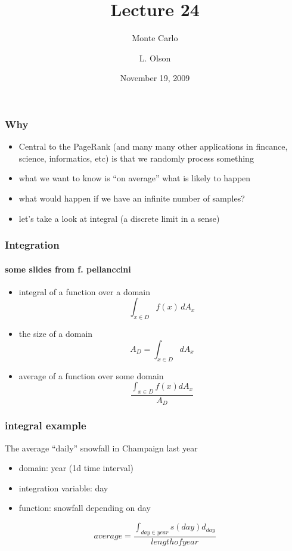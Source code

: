 \documentclass[10pt]{beamer}
\author{L. Olson}
\institute[UIUC]
{Department of Computer Science\\
University of Illinois at Urbana-Champaign\\
\vspace{0.5cm}
}
\title[CS 357]{Lecture 24}
\subtitle{Monte Carlo}
\date{November 19, 2009}
\begin{document}
\begin{frame}
  \titlepage
\end{frame}
\begin{frame}
\frametitle{Why}
\begin{itemize}
  \item Central to the PageRank (and many many other applications in
fincance, science, informatics, etc) is that we randomly process
something
  \item what we want to know is ``on average'' what is likely to happen
  \item what would happen if we have an infinite number of samples?
  \item let's take a look at integral (a discrete limit in a sense)
\end{itemize}
\end{frame}
\begin{frame}
\frametitle{Integration}
\framesubtitle{some slides from f. pellanccini}
  \begin{itemize}
  \item integral of a function over a domain
\begin{equation*} 
\int_{x\in D} f(x) \,dA_x
\end{equation*}
  \item the size of a domain
\begin{equation*} 
A_D = \int_{x\in D} dA_x
\end{equation*}
  \item average of a function over some domain
\begin{equation*} 
\frac{\int_{x\in D} f(x) dA_x}{A_D}
\end{equation*}
\end{itemize}
\end{frame}
\begin{frame}
\frametitle{integral example}
The average ``daily'' snowfall in Champaign last year
  \begin{itemize}
    \item domain: year (1d time interval)
    \item integration variable: day
    \item function: snowfall depending on day
  \end{itemize}
\begin{equation*}
  average = \frac{\int_{day\in year} s(day)d_{day}}{length of year}
\end{equation*}
\end{frame}
\end{document}
